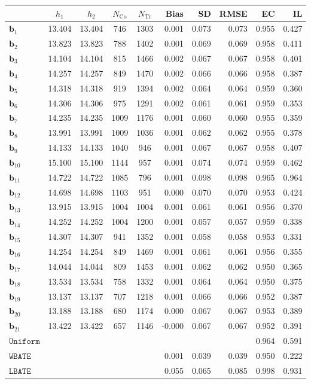 \documentclass[10pt]{article}
\newcommand{\bb}{\mathbf{b}}
\begin{document}
\begin{table}[p]
    \centering
\begin{tabular}{lccccrrrrr}
\toprule\toprule
 & $h_1$ & $h_2$ & $N_{\mathrm{Co}}$ & $N_{\mathrm{Tr}}$ & Bias & SD & RMSE & EC & IL \\
\midrule
$\bb_{1}$ & 13.404 & 13.404 & 746 & 1303 & 0.001 & 0.073 & 0.073 & 0.955 & 0.427 \\
$\bb_{2}$ & 13.823 & 13.823 & 788 & 1402 & 0.001 & 0.069 & 0.069 & 0.958 & 0.411 \\
$\bb_{3}$ & 14.104 & 14.104 & 815 & 1466 & 0.002 & 0.067 & 0.067 & 0.958 & 0.401 \\
$\bb_{4}$ & 14.257 & 14.257 & 849 & 1470 & 0.002 & 0.066 & 0.066 & 0.958 & 0.387 \\
$\bb_{5}$ & 14.318 & 14.318 & 919 & 1394 & 0.002 & 0.064 & 0.064 & 0.959 & 0.360 \\
$\bb_{6}$ & 14.306 & 14.306 & 975 & 1291 & 0.002 & 0.061 & 0.061 & 0.959 & 0.353 \\
$\bb_{7}$ & 14.235 & 14.235 & 1009 & 1176 & 0.001 & 0.060 & 0.060 & 0.955 & 0.359 \\
$\bb_{8}$ & 13.991 & 13.991 & 1009 & 1036 & 0.001 & 0.062 & 0.062 & 0.955 & 0.378 \\
$\bb_{9}$ & 14.133 & 14.133 & 1040 & 946 & 0.001 & 0.067 & 0.067 & 0.958 & 0.407 \\
$\bb_{10}$ & 15.100 & 15.100 & 1144 & 957 & 0.001 & 0.074 & 0.074 & 0.959 & 0.462 \\
$\bb_{11}$ & 14.722 & 14.722 & 1085 & 796 & 0.001 & 0.098 & 0.098 & 0.965 & 0.964 \\
$\bb_{12}$ & 14.698 & 14.698 & 1103 & 951 & 0.000 & 0.070 & 0.070 & 0.953 & 0.424 \\
$\bb_{13}$ & 13.915 & 13.915 & 1004 & 1004 & 0.001 & 0.061 & 0.061 & 0.956 & 0.370 \\
$\bb_{14}$ & 14.252 & 14.252 & 1004 & 1200 & 0.001 & 0.057 & 0.057 & 0.959 & 0.338 \\
$\bb_{15}$ & 14.307 & 14.307 & 941 & 1352 & 0.001 & 0.058 & 0.058 & 0.953 & 0.331 \\
$\bb_{16}$ & 14.254 & 14.254 & 849 & 1469 & 0.001 & 0.061 & 0.061 & 0.956 & 0.355 \\
$\bb_{17}$ & 14.044 & 14.044 & 809 & 1453 & 0.001 & 0.062 & 0.062 & 0.950 & 0.365 \\
$\bb_{18}$ & 13.534 & 13.534 & 758 & 1332 & 0.001 & 0.064 & 0.064 & 0.950 & 0.375 \\
$\bb_{19}$ & 13.137 & 13.137 & 707 & 1218 & 0.001 & 0.066 & 0.066 & 0.952 & 0.387 \\
$\bb_{20}$ & 13.188 & 13.188 & 680 & 1174 & 0.000 & 0.067 & 0.067 & 0.953 & 0.389 \\
$\bb_{21}$ & 13.422 & 13.422 & 657 & 1146 & -0.000 & 0.067 & 0.067 & 0.952 & 0.391 \\
\midrule
$\mathtt{Uniform}$ &  &  &  &  &  &  &  & 0.964 & 0.591 \\
\midrule
$\mathtt{WBATE}$ &  &  &  &  & 0.001 & 0.039 & 0.039 & 0.950 & 0.222 \\
\midrule
$\mathtt{LBATE}$ &  &  &  &  & 0.055 & 0.065 & 0.085 & 0.998 & 0.931 \\
\bottomrule\bottomrule
\end{tabular}


\end{table}
\end{document}
